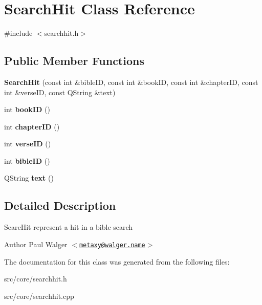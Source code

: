 \hypertarget{classSearchHit}{
\section{SearchHit Class Reference}
\label{classSearchHit}
}


{\ttfamily \#include $<$searchhit.h$>$}\subsection*{Public Member Functions}
\begin{DoxyCompactItemize}
\item 
\hypertarget{classSearchHit_af526354ebfb42d6091f3da55117e9958}{
{\bfseries SearchHit} (const int \&bibleID, const int \&bookID, const int \&chapterID, const int \&verseID, const QString \&text)}
\label{classSearchHit_af526354ebfb42d6091f3da55117e9958}

\item 
\hypertarget{classSearchHit_a9c78f4832e60f93571f15e89e30c6191}{
int {\bfseries bookID} ()}
\label{classSearchHit_a9c78f4832e60f93571f15e89e30c6191}

\item 
\hypertarget{classSearchHit_a40a5c7eabd87ef4a0987b52da95929d3}{
int {\bfseries chapterID} ()}
\label{classSearchHit_a40a5c7eabd87ef4a0987b52da95929d3}

\item 
\hypertarget{classSearchHit_a1dd0cd0b18ff52629b476f129cc53377}{
int {\bfseries verseID} ()}
\label{classSearchHit_a1dd0cd0b18ff52629b476f129cc53377}

\item 
\hypertarget{classSearchHit_aaf59f8e8b54164c9d369b8148bfb5e18}{
int {\bfseries bibleID} ()}
\label{classSearchHit_aaf59f8e8b54164c9d369b8148bfb5e18}

\item 
\hypertarget{classSearchHit_ae7c70f7ec454099ae9a052a4e4efa6a4}{
QString {\bfseries text} ()}
\label{classSearchHit_ae7c70f7ec454099ae9a052a4e4efa6a4}

\end{DoxyCompactItemize}


\subsection{Detailed Description}
SearcHit represent a hit in a bible search

\begin{DoxyAuthor}{Author}
Paul Walger $<$\href{mailto:metaxy@walger.name}{\tt metaxy@walger.name}$>$ 
\end{DoxyAuthor}


The documentation for this class was generated from the following files:\begin{DoxyCompactItemize}
\item 
src/core/searchhit.h\item 
src/core/searchhit.cpp\end{DoxyCompactItemize}
